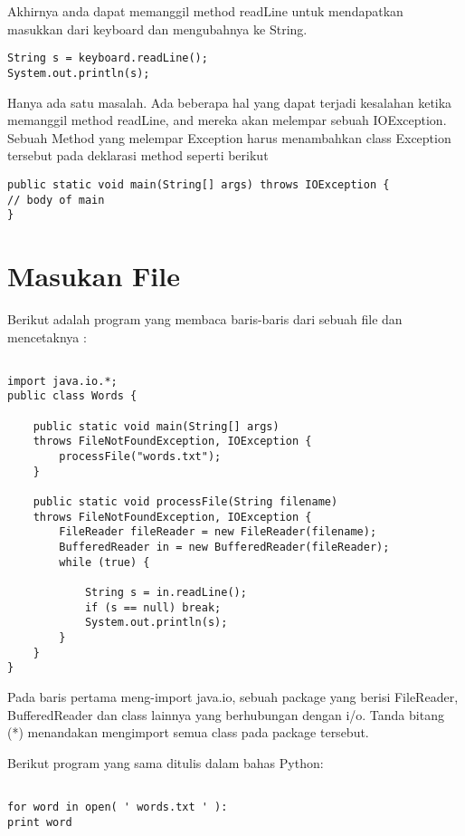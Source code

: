 Akhirnya anda dapat memanggil method readLine untuk mendapatkan masukkan dari keyboard dan mengubahnya ke String.
\begin{lstlisting}
String s = keyboard.readLine();
System.out.println(s);
\end{lstlisting}

Hanya ada satu masalah. Ada beberapa hal yang dapat terjadi kesalahan ketika memanggil method readLine, and mereka akan melempar sebuah IOException. Sebuah Method yang melempar Exception harus menambahkan class Exception tersebut pada deklarasi method seperti berikut

\begin{lstlisting}
public static void main(String[] args) throws IOException {
// body of main
}
\end{lstlisting}

\section{Masukan File}

Berikut adalah program yang membaca baris-baris dari sebuah file dan mencetaknya :

\begin{lstlisting}

import java.io.*;
public class Words {

	public static void main(String[] args)
	throws FileNotFoundException, IOException {
		processFile("words.txt");
	}
	
	public static void processFile(String filename)
	throws FileNotFoundException, IOException {
		FileReader fileReader = new FileReader(filename);
		BufferedReader in = new BufferedReader(fileReader);
		while (true) {

			String s = in.readLine();
			if (s == null) break;
			System.out.println(s);
		}
	}
}

\end{lstlisting}

Pada baris pertama meng-import java.io, sebuah package yang berisi FileReader, BufferedReader dan class lainnya yang berhubungan dengan i/o. Tanda bitang (*) menandakan mengimport semua class pada package tersebut.


Berikut program yang sama ditulis dalam bahas Python:

\begin{lstlisting}

for word in open( ' words.txt ' ):
print word

\end{lstlisting}

